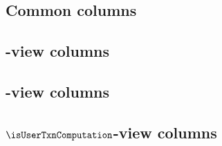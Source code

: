 \subsection{Common                         columns \lispDone{}}    \label{user txn data: generalities: columns: common}          
\subsection{\hubMod              {}-view   columns \lispDone{}}    \label{user txn data: generalities: columns: hub view}        
\subsection{\rlpTxnMod           {}-view   columns \lispDone{}}    \label{user txn data: generalities: columns: rlp view}        
\subsection{$\isUserTxnComputation$-view   columns \lispDone{}}    \label{user txn data: generalities: columns: computation}     
